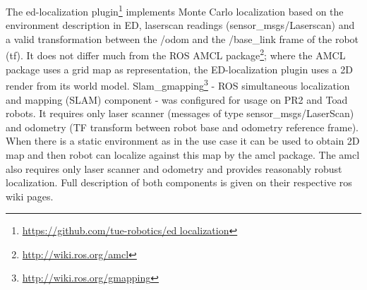 The \acrshort{ed}-localization plugin\footnote{\url{https://github.com/tue-robotics/ed localization}} implements Monte Carlo localization based on the environment description in ED, laserscan readings (sensor\_msgs/Laserscan) and a valid transformation between the /odom and the /base\_link frame of the robot (tf). It does not differ much from the ROS AMCL package\footnote{\url{http://wiki.ros.org/amcl}}; where the AMCL package uses a grid map as representation, the ED-localization plugin uses a 2D render from its world model. 
Slam\_gmapping\footnote{\url{http://wiki.ros.org/gmapping}} - ROS simultaneous localization and mapping (SLAM) component - was configured for usage on PR2 and Toad robots. It requires only laser scanner (messages of type sensor\_msgs/LaserScan) and odometry (TF transform between robot base and odometry reference frame). When there is a static environment as in the use case it can be used to obtain 2D map and then robot can localize against this map by the \acrshort{amcl} package. The \acrshort{amcl} also requires only laser scanner and odometry and provides reasonably robust localization. Full description of both components is given on their respective \acrshort{ros} wiki pages.